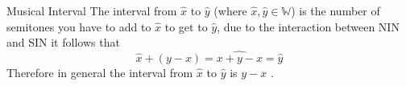 \documentclass{standalone}
\begin{document}
\begin{defn*}{Musical Interval}
  The interval from  $ \widehat{x}$ to $ \widehat{y }$ (where $ \widehat{x}, \widehat{y} \in \mathbb{W}$) is the number of semitones you have to add to $ \widehat{x}$ to get to $ \widehat{y}$, due to the interaction between NIN and SIN it follows that 
  \[
    \widehat{x}  +  \left( y  -  x \right) = \widehat{x  +  y  -  x} = \widehat{y}
  \]
  Therefore in general the interval from $ \widehat{x}$  to $ \widehat{y}$ is $y  - x$ .
\end{defn*}
\end{document}
